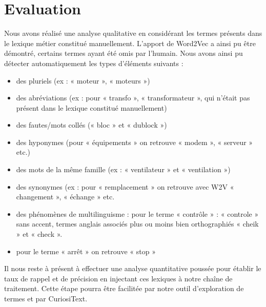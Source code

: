 \section{Evaluation}
Nous avons réalisé une analyse qualitative en considérant les termes présents dans le lexique métier constitué manuellement. L'apport de Word2Vec a ainsi pu être démontré, certains termes ayant été omis par l'humain. Nous avons ainsi pu détecter automatiquement les types d’éléments suivants :

\begin{itemize}
\item des pluriels (ex : « moteur », « moteurs »)
\item 	des abréviations (ex : pour « transfo », « transformateur », qui n’était pas présent dans le lexique constitué manuellement)
\item 	des fautes/mots collés (« bloc » et « dublock »)
\item 	des hyponymes (pour « équipements » on retrouve « modem », « serveur » etc.)
\item 	des mots de la même famille (ex : « ventilateur » et « ventilation »)
\item 	des synonymes (ex : pour « remplacement » on retrouve avec W2V « changement », « échange » etc.
\item 	des phénomènes de multilinguisme : pour le terme « contrôle » : « controle » sans accent, termes anglais associés plus ou moins bien orthographiés « cheik » et « check ».
\item 	pour le terme « arrêt » on retrouve « stop »

\end{itemize}

Il nous reste à présent à effectuer une analyse quantitative poussée pour établir le taux de rappel et de précision en injectant ces lexiques à notre chaîne de traitement. Cette étape pourra être facilitée par notre outil d’exploration de termes et par CuriosiText.
